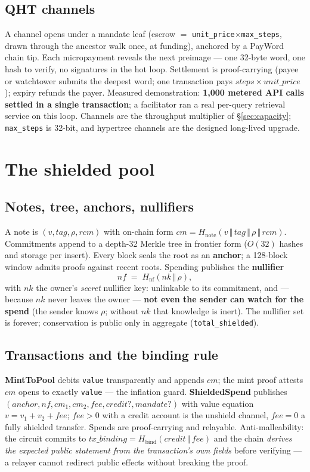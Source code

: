 \documentclass[11pt]{article}
\newcommand{\Hh}[1]{H_{\mathrm{#1}}}
\newcommand{\ct}[1]{\texttt{#1}}
\begin{document}
\subsection{QHT channels}
A channel opens under a mandate leaf (escrow $=$ \ct{unit\_price}$\times$\ct{max\_steps}, drawn through the ancestor walk once, at funding), anchored by a PayWord chain tip. Each micropayment reveals the next preimage --- one 32-byte word, one hash to verify, no signatures in the hot loop. Settlement is proof-carrying (payee or watchtower submits the deepest word; one transaction pays $\mathit{steps}\times\mathit{unit\_price}$); expiry refunds the payer. Measured demonstration: \textbf{1{,}000 metered API calls settled in a single transaction}; a facilitator ran a real per-query retrieval service on this loop. Channels are the throughput multiplier of \S\ref{sec:capacity}; \ct{max\_steps} is 32-bit, and hypertree channels are the designed long-lived upgrade.

\section{The shielded pool}\label{sec:pool}
\subsection{Notes, tree, anchors, nullifiers}
A note is $(v,\mathit{tag},\rho,\mathit{rcm})$ with on-chain form $\mathit{cm}=\Hh{note}(v \,\Vert\, \mathit{tag} \,\Vert\, \rho \,\Vert\, \mathit{rcm})$. Commitments append to a depth-32 Merkle tree in frontier form ($O(32)$ hashes and storage per insert). Every block seals the root as an \textbf{anchor}; a 128-block window admits proofs against recent roots. Spending publishes the \textbf{nullifier}
\[ \mathit{nf} \;=\; \Hh{nf}(\mathit{nk} \,\Vert\, \rho), \]
with $\mathit{nk}$ the owner's \emph{secret} nullifier key: unlinkable to its commitment, and --- because $\mathit{nk}$ never leaves the owner --- \textbf{not even the sender can watch for the spend} (the sender knows $\rho$; without $\mathit{nk}$ that knowledge is inert). The nullifier set is forever; conservation is public only in aggregate (\ct{total\_shielded}).

\subsection{Transactions and the binding rule}
\textbf{MintToPool} debits \ct{value} transparently and appends $\mathit{cm}$; the mint proof attests $\mathit{cm}$ opens to exactly \ct{value} --- the inflation guard. \textbf{ShieldedSpend} publishes $(\mathit{anchor}, \mathit{nf}, \mathit{cm}_1, \mathit{cm}_2, \mathit{fee}, \mathit{credit?}, \mathit{mandate?})$ with value equation $v = v_1 + v_2 + \mathit{fee}$; $\mathit{fee}>0$ with a credit account is the unshield channel, $\mathit{fee}=0$ a fully shielded transfer. Spends are proof-carrying and relayable. Anti-malleability: the circuit commits to $\mathit{tx\_binding}=\Hh{bind}(\mathit{credit}\,\Vert\,\mathit{fee})$ and the chain \emph{derives the expected public statement from the transaction's own fields} before verifying --- a relayer cannot redirect public effects without breaking the proof.
\end{document}
